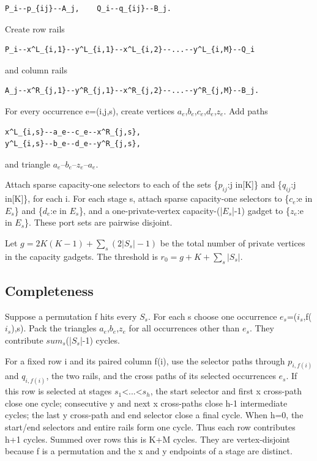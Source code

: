 \documentclass[11pt]{article}
\begin{document}
\begin{verbatim}
P_i--p_{ij}--A_j,    Q_i--q_{ij}--B_j.
\end{verbatim}

Create row rails

\begin{verbatim}
P_i--x^L_{i,1}--y^L_{i,1}--x^L_{i,2}--...--y^L_{i,M}--Q_i
\end{verbatim}

and column rails

\begin{verbatim}
A_j--x^R_{j,1}--y^R_{j,1}--x^R_{j,2}--...--y^R_{j,M}--B_j.
\end{verbatim}

For every occurrence e=(i,j,s), create vertices $a_e$,$b_e$,$c_e$,$d_e$,$z_e$. Add paths

\begin{verbatim}
x^L_{i,s}--a_e--c_e--x^R_{j,s},
y^L_{i,s}--b_e--d_e--y^R_{j,s},
\end{verbatim}

and triangle $a_e$--$b_e$--$z_e$--$a_e$.

Attach sparse capacity-one selectors to each of the sets \{$p_{ij}$:j in[K]\} and \{$q_{ij}$:j in[K]\}, for each i. For each stage s, attach sparse capacity-one selectors to \{$c_e$:e in $E_s$\} and \{$d_e$:e in $E_s$\}, and a one-private-vertex capacity-(|$E_s$|-1) gadget to \{$z_e$:e in $E_s$\}. These port sets are pairwise disjoint.

Let $g=2K(K-1)+\sum_s(2|S_s|-1)$ be the total number of private vertices in the capacity gadgets. The threshold is $r_0=g+K+\sum_s|S_s|$.

\subsection{Completeness}

Suppose a permutation f hits every $S_s$. For each s choose one occurrence $e_s$=($i_s$,f($i_s$),s). Pack the triangles $a_e$,$b_e$,$z_e$ for all occurrences other than $e_s$. They contribute $sum_s$(|$S_s$|-1) cycles.

For a fixed row i and its paired column f(i), use the selector paths through $p_{i,f(i)}$ and $q_{i,f(i)}$, the two rails, and the cross paths of its selected occurrences $e_s$. If this row is selected at stages $s_1$<...<$s_h$, the start selector and first x cross-path close one cycle; consecutive y and next x cross-paths close h-1 intermediate cycles; the last y cross-path and end selector close a final cycle. When h=0, the start/end selectors and entire rails form one cycle. Thus each row contributes h+1 cycles. Summed over rows this is K+M cycles. They are vertex-disjoint because f is a permutation and the x and y endpoints of a stage are distinct.
\end{document}
